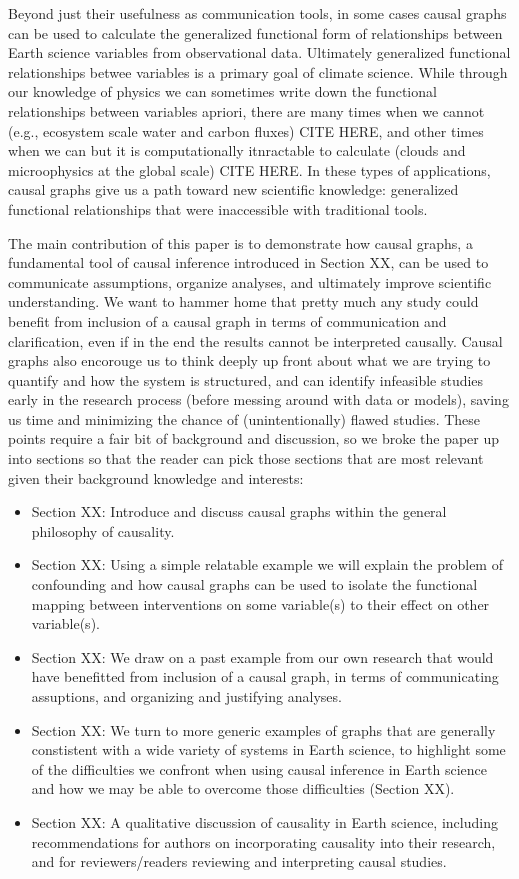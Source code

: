 \documentclass[12pt]{article}
\begin{document}
Beyond just their usefulness as communication tools, in some cases
causal graphs can be used to calculate the generalized functional form
of relationships between Earth science variables from observational
data. Ultimately generalized functional relationships betwee variables
is a primary goal of climate science. While through our knowledge of
physics we can sometimes write down the functional relationships
between variables apriori, there are many times when we cannot (e.g.,
ecosystem scale water and carbon fluxes) CITE HERE, and other times
when we can but it is computationally itnractable to calculate (clouds
and microophysics at the global scale) CITE HERE. In these types of
applications, causal graphs give us a path toward new scientific
knowledge: generalized functional relationships that were inaccessible
with traditional tools.

The main contribution of this paper is to demonstrate how causal
graphs, a fundamental tool of causal inference introduced in Section
XX, can be used to communicate assumptions, organize analyses, and
ultimately improve scientific understanding. We want to hammer home
that pretty much any study could benefit from inclusion of a causal
graph in terms of communication and clarification, even if in the end
the results cannot be interpreted causally. Causal graphs also
encorouge us to think deeply up front about what we are trying to
quantify and how the system is structured, and can identify infeasible
studies early in the research process (before messing around with data
or models), saving us time and minimizing the chance of
(unintentionally) flawed studies. These points require a fair bit of
background and discussion, so we broke the paper up into sections so
that the reader can pick those sections that are most relevant given
their background knowledge and interests:

\begin{itemize}
\item Section XX: Introduce and discuss causal graphs within the
  general philosophy of causality.
\item Section XX: Using a simple relatable example we will explain
  the problem of confounding and how causal graphs can be used to
  isolate the functional mapping between interventions on some
  variable(s) to their effect on other variable(s).
\item Section XX: We draw on a past example from our own research that
  would have benefitted from inclusion of a causal graph, in terms of
  communicating assuptions, and organizing and justifying analyses.
\item Section XX: We turn to more generic examples of graphs that are
  generally constistent with a wide variety of systems in Earth
  science, to highlight some of the difficulties we confront when
  using causal inference in Earth science and how we may be able to
  overcome those difficulties (Section XX).
\item Section XX: A qualitative discussion of causality in Earth
  science, including recommendations for authors on incorporating
  causality into their research, and for reviewers/readers reviewing
  and interpreting causal studies.
\end{itemize}
\end{document}
